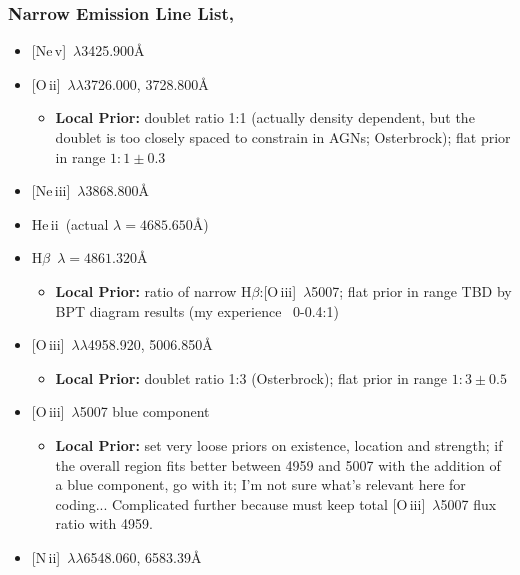 \documentclass[12pt,letterpaper]{article}
\newcommand{\Hbeta}{\ifmmode {\rm H}\beta \else H$\beta$\fi}
\newcommand{\heii}{He\,{\sc ii}}
\newcommand{\neiii}{Ne\,{\sc iii}}
\newcommand{\nev}{Ne\,{\sc v}}
\newcommand{\nii}{N\,{\sc ii}}
\newcommand{\oii}{O\,{\sc ii}}
\newcommand{\oiii}{O\,{\sc iii}}
\begin{document}
\subsubsection*{\bf Narrow Emission Line List, }
    \begin{itemize}
      \itemsep-0.1cm
      \item {[\nev]\, $\lambda$3425.900\AA}
      \item {[\oii]\, $\lambda \lambda$3726.000, 3728.800\AA}
        \begin{itemize}
          \item {\bf Local Prior:} doublet ratio 1:1 (actually density dependent, but the doublet is too closely spaced to constrain in AGNs; Osterbrock); flat prior in range $1:1\pm 0.3$
        \end{itemize}
      \item {[\neiii]\, $\lambda$3868.800\AA}
      \item \heii\ (actual $\lambda=4685.650$\AA) 
      \item \Hbeta\ $\lambda=4861.320$\AA
        \begin{itemize}
          \item {\bf Local Prior:} ratio of narrow \Hbeta:[\oiii]\, $\lambda$5007; flat prior in range TBD by BPT diagram results (my experience ~0-0.4:1)
        \end{itemize}
      \item {[\oiii]\, $\lambda \lambda$4958.920, 5006.850\AA}
        \begin{itemize}
        \item {\bf Local Prior:} doublet ratio 1:3 (Osterbrock); flat prior in range $1:3\pm 0.5$
        \end{itemize}
      \item {[\oiii]\, $\lambda$5007 blue component}
          \begin{itemize}
          \item {\bf Local Prior:} set very loose priors on existence,
            location and strength; if the overall region fits better
            between 4959 and 5007 with the addition of a blue component,
            go with it; I'm not sure what's relevant here for coding...
            Complicated further because must keep total [\oiii]\,
            $\lambda$5007 flux ratio with 4959.
          \end{itemize}
      \item {[\nii]\, $\lambda \lambda$6548.060, 6583.39\AA}
        \begin{itemize}

\end{itemize}
\end{itemize}
\end{document}
